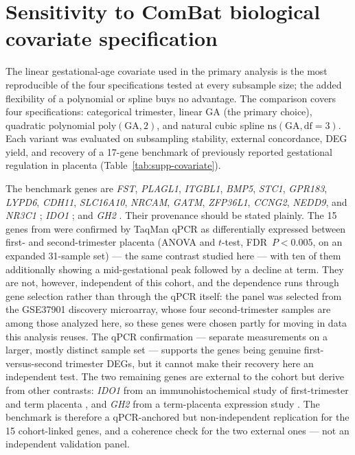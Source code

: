 \documentclass[11pt,a4paper]{article}
\begin{document}
\section{Sensitivity to ComBat biological covariate specification}
\label{sec:supp-covariate}

The linear gestational-age covariate used in the primary
analysis is the most reproducible of the four specifications
tested at every subsample size; the
added flexibility of a polynomial or spline buys no advantage.
The comparison covers four specifications:
categorical trimester, linear GA (the primary choice), quadratic
polynomial $\text{poly}(\text{GA},2)$, and natural cubic spline
$\text{ns}(\text{GA}, \text{df}=3)$. Each variant was evaluated on
subsampling stability, external concordance, DEG yield, and
recovery of a 17-gene benchmark of previously reported
gestational regulation in placenta
(Table~\ref{tab:supp-covariate}).

The benchmark genes are \textit{FST}, \textit{PLAGL1},
\textit{ITGBL1}, \textit{BMP5}, \textit{STC1}, \textit{GPR183},
\textit{LYPD6}, \textit{CDH11}, \textit{SLC16A10},
\textit{NRCAM}, \textit{GATM}, \textit{ZFP36L1},
\textit{CCNG2}, \textit{NEDD9}, and \textit{NR3C1}
\citep{Uuskula2012}; \textit{IDO1} \citep{Blaschitz2011}; and
\textit{GH2} \citep{Mannik2012}. Their provenance should be
stated plainly. The 15 genes from \citet{Uuskula2012} were
confirmed by TaqMan qPCR as differentially expressed between
first- and second-trimester placenta (ANOVA and $t$-test,
FDR~$P < 0.005$, on an expanded 31-sample set) --- the same
contrast studied here --- with ten of them additionally showing
a mid-gestational peak followed by a decline at term. They are
not, however, independent of this cohort, and the dependence
runs through gene selection rather than through the qPCR
itself: the panel was selected from the GSE37901 discovery
microarray, whose four second-trimester samples are among
those analyzed here, so these genes were chosen partly for
moving in data this analysis reuses. The qPCR confirmation ---
separate measurements on a larger, mostly distinct sample set
--- supports the genes being genuine first-versus-second
trimester DEGs, but it cannot make their recovery here an
independent test. The two remaining genes are external to the
cohort but derive from other contrasts: \textit{IDO1} from an
immunohistochemical study of first-trimester and term placenta
\citep{Blaschitz2011}, and \textit{GH2} from a term-placenta
expression study \citep{Mannik2012}. The benchmark is
therefore a qPCR-anchored but non-independent replication for
the 15 cohort-linked genes, and a coherence check for the two
external ones --- not an independent validation panel.
\end{document}
